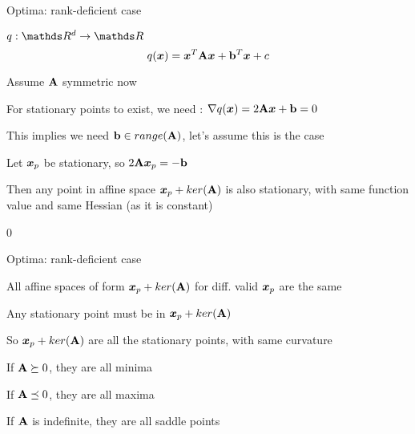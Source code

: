 \documentclass[11pt,compress,t,notes=noshow, xcolor=table]{beamer}
\begin{document}
\begin{framei}[fs=footnotesize]{Optima: rank-deficient case}
\item $q: \R^d \to \R$
$$ q(\bm{x}) = \bm{x}^T \mathbf{A} \bm{x} + \mathbf{b}^T \bm{x} + c $$
\item Assume $\mathbf{A}$ symmetric now
\item For stationary points to exist, we need : $\nabla q(\bm{x}) = 2 \mathbf{A} \bm{x} + \mathbf{b} = 0$
\item This implies we need $\mathbf{b} \in range(\mathbf{A})$, let's assume this is the case
\item Let $\bm{x}_p$ be stationary, so $2 \mathbf{A} \bm{x}_p = -\mathbf{b}$
\item Then any point in affine space $\bm{x}_p + ker(\mathbf{A})$ is also stationary, with same function value and same Hessian (as it is constant)
\end{framei}0


\begin{framei}[fs=footnotesize]{Optima: rank-deficient case}
\item All affine spaces of form $\bm{x}_p + ker(\mathbf{A})$ for diff. valid $\bm{x}_p$ are the same
\item Any stationary point must be in $\bm{x}_p + ker(\mathbf{A})$
\item So $\bm{x}_p + ker(\mathbf{A})$ are all the stationary points, with same curvature
\item If $\mathbf{A} \succeq 0$, they are all minima
\item If $\mathbf{A} \preceq 0$, they are all maxima
\item If $\mathbf{A}$ is indefinite, they are all saddle points
\end{framei}
  

\endlecture
\end{document}
